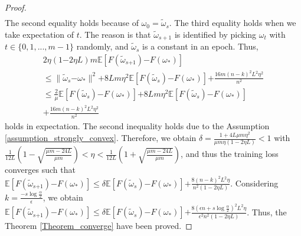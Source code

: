 \documentclass[letterpaper]{article}
\begin{document}
\begin{proof}
\begin{equation}
\begin{array}{ll}
\end{array} 
\end{equation} The second equality  holds because of $\omega_0=\tilde{\omega}_s$. The third equality holds when we take expectation of $t$. The reason is that $\tilde{\omega}_{s+1}$  is identified by picking $\omega_t$ with $t\in\{0,1, ..., m-1\}$ randomly, and $\tilde{\omega}_s$ is a constant in an epoch.  Thus, 
\begin{equation}
\begin{array}{ll}
2\eta(1\mathrm{-}2\eta L)m \mathbb{E} [F(\tilde{\omega}_{s\mathrm{+}1}) \mathrm{-} F(\omega_\ast) ] \\
\le  \parallel  \tilde{\omega}_{s}\mathrm{-}\omega_\ast  \parallel^2 \mathrm{+} 8L m \eta^2 \mathbb{E}[F(\tilde{\omega}_s)\mathrm{-}F(\omega_\ast)] \mathrm{+}\frac{16m(n-k)^2L^2\eta^2}{n^2}\\ 
\le \frac{2}{\mu}\mathbb{E}[ F(\tilde{\omega}_{s}) \mathrm{-}  F(\omega_\ast)  ]\mathrm{+} 8L m \eta^2 \mathbb{E}[F(\tilde{\omega}_s)\mathrm{-}F(\omega_\ast)] \\
\mathrm{+}\frac{16m(n-k)^2L^2\eta^2}{n^2}
\end{array} 
\end{equation} holds in expectation. The second inequality holds due to the Assumption \ref{assumption_strongly_convex}. Therefore, we obtain $\delta=\frac{1+4L\mu m \eta^2}{  \mu m \eta (1-2\eta L)  } < 1$ with $\frac{1}{12L}\left( 1- \sqrt{\frac{\mu m - 24L}{\mu m}} \right) < \eta < \frac{1}{12L}\left( 1+ \sqrt{\frac{\mu m - 24L}{\mu m}} \right)$, and thus the training loss converges such that
$\mathbb{E}[F(\tilde{\omega}_{s\mathrm{+}1}) \mathrm{-} F(\omega_\ast)]  \le \delta \mathbb{E}[F(\tilde{\omega}_s)\mathrm{-}F(\omega_\ast)] \mathrm{+} \frac{8(n-k)^2L^2\eta}{n^2(1-2\eta L)}$. Considering $k\mathrm{=}\frac{-s\log\frac{\alpha}{2}}{\epsilon}$, we obtain $\mathbb{E}[F(\tilde{\omega}_{s\mathrm{+}1}) \mathrm{-} F(\omega_\ast)]  \le \delta \mathbb{E}[F(\tilde{\omega}_s)\mathrm{-}F(\omega_\ast)] \mathrm{+} \frac{8(\epsilon n+s\log\frac{\alpha}{2})^2L^2\eta}{\epsilon^2n^2(1-2\eta L)}$. Thus, the Theorem \ref{Theorem_converge} have been proved.
\end{proof}
\end{document}
